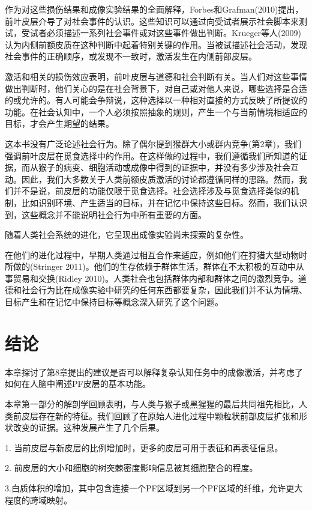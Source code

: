作为对这些损伤结果和成像实验结果的全面解释，Forbes和Grafman(2010)提出，前叶皮层介导了对社会事件的认识。这些知识可以通过向受试者展示社会脚本来测试，受试者必须描述一系列社会事件或对这些事件做出判断。Krueger等人(2009)认为内侧前额皮质在这种判断中起着特别关键的作用。当被试描述社会活动，发现社会事件的正确顺序，或发现不一致时，激活发生在内侧前部皮层。

激活和相关的损伤效应表明，前叶皮层与道德和社会判断有关。当人们对这些事情做出判断时，他们关心的是在社会背景下，对自己或对他人来说，哪些选择是合适的或允许的。有人可能会争辩说，这种选择以一种相对直接的方式反映了所提议的功能。在社会认知中，一个人必须按照抽象的规则，产生一个与当前情境相适应的目标，才会产生期望的结果。

这本书没有广泛论述社会行为。除了偶尔提到猴群大小或群内竞争(第2章)，我们强调前叶皮层在觅食选择中的作用。在这样做的过程中，我们遵循我们所知道的证据，而从猴子的病变、细胞活动或成像中得到的证据中，并没有多少涉及社会互动。因此，我们大多数关于人类前额皮质激活的讨论都遵循同样的思路。然而，我们并不是说，前皮层的功能仅限于觅食选择。社会选择涉及与觅食选择类似的机制，比如识别环境、产生适当的目标，并在记忆中保持这些目标。然而，我们认识到，这些概念并不能说明社会行为中所有重要的方面。

随着人类社会系统的进化，它呈现出成像实验尚未探索的复杂性。

在他们的进化过程中，早期人类通过相互合作来适应，例如他们在狩猎大型动物时所做的(Stringer 2011)。他们的生存依赖于群体生活，群体在不太积极的互动中从事贸易和交换(Ridley 2010)。人类社会也包括群体内部和群体之间的激烈竞争。道德和社会行为比在成像实验中研究的任何东西都要复杂，因此我们并不认为情境、目标产生和在记忆中保持目标等概念深入研究了这个问题。

\section{结论}

本章探讨了第8章提出的建议是否可以解释复杂认知任务中的成像激活，并考虑了如何在人脑中阐述PF皮层的基本功能。

本章第一部分的解剖学回顾表明，与人类与猴子或黑猩猩的最后共同祖先相比，人类前皮层存在新的特征。我们回顾了在原始人进化过程中颗粒状前部皮层扩张和形状改变的证据。这种发展产生了几个后果。

1. 当前皮层与新皮层的比例增加时，更多的皮层可用于表征和再表征信息。

2. 前皮层的大小和细胞的树突棘密度影响信息被其细胞整合的程度。

3.白质体积的增加，其中包含连接一个PF区域到另一个PF区域的纤维，允许更大程度的跨域映射。

